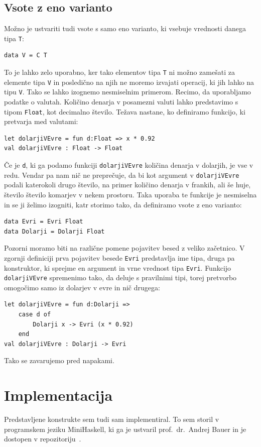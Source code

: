 \documentclass[a4paper,12pt,openright]{book}
\begin{document}
\section{Vsote z eno varianto}
Možno je ustvariti tudi vsote s samo eno varianto, ki vsebuje vrednosti danega tipa \lstinline{T}:
\begin{lstlisting}
data V = C T
\end{lstlisting}
To je lahko zelo uporabno, ker tako elementov tipa \lstinline{T} ni možno zamešati za elemente tipa \lstinline{V} in posledično na njih ne moremo izvajati operacij, ki jih lahko na tipu 
\lstinline{V}. Tako se lahko izognemo nesmiselnim primerom. Recimo, da uporabljamo podatke o valutah. Količino denarja v posamezni valuti lahko predstavimo s tipom \lstinline{Float}, kot decimalno 
število. Težava nastane, ko definiramo funkcijo, ki pretvarja med valutami:
\begin{lstlisting}
let dolarjiVEvre = fun d:Float => x * 0.92
val dolarjiVEvre : Float -> Float
\end{lstlisting}
Če je \lstinline{d}, ki ga podamo funkciji \lstinline{dolarjiVEvre} količina denarja v dolarjih, je vse v redu. Vendar pa nam nič ne 
preprečuje, da bi kot argument v \lstinline{dolarjiVEvre} podali katerokoli drugo število, na primer količino denarja v frankih, ali še huje, število število komarjev v nekem prostoru. Taka uporaba te 
funkcije je nesmiselna in se ji želimo izogniti, katr storimo tako, da definiramo vsote z eno varianto:
\begin{lstlisting}
data Evri = Evri Float
data Dolarji = Dolarji Float
\end{lstlisting}
Pozorni moramo biti na različne pomene pojavitev besed z veliko začetnico. V zgornji definiciji prva pojavitev besede \lstinline{Evri} predstavlja ime tipa, druga pa konstruktor, ki sprejme en argument in 
vrne vrednost tipa \lstinline{Evri}.
Funkcijo \lstinline{dolarjiVEvre} spremenimo tako, da deluje s pravilnimi tipi, torej pretvorbo omogočimo 
samo iz dolarjev v evre in nič drugega:
\begin{lstlisting}
let dolarjiVEvre = fun d:Dolarji =>
    case d of 
        Dolarji x -> Evri (x * 0.92)
    end
val dolarjiVEvre : Dolarji -> Evri
\end{lstlisting}
Tako se zavarujemo pred napakami.
\newpage

\chapter{Implementacija}
Predstavljene konstrukte sem tudi sam implementiral. To sem storil v programskem jeziku MiniHaskell, ki ga je ustvaril prof.\ dr.\ Andrej Bauer in 
je dostopen v repozitoriju~\cite{bauer:plzoo}.
\end{document}
